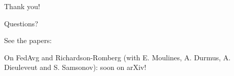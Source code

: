 \documentclass[aspectratio=169,14pt]{beamer}
\begin{document}
  \begin{frame}
    \begin{center}
      \LARGE Thank you!

      \normalsize Questions?
    \end{center}
    

    \small
    See the papers:


    On FedAvg and Richardson-Romberg (with \textcolor{beamer@blendedblue}{E. Moulines, A. Durmus, A. Dieuleveut and S. Samsonov}): soon on arXiv!
  \end{frame}
\end{document}
